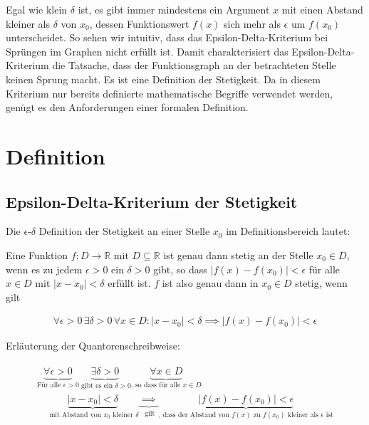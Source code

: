 \documentclass[fontsize=9pt,
               parskip=half-,
               DIV=14,
               listof=chapterentry,
               tocflat]{scrbook}
\begin{document}
Egal wie klein $\delta $ ist, es gibt immer mindestens ein Argument $x$ mit einen Abstand kleiner als $\delta $ von $x_{0}$, dessen Funktionswert $f(x)$ sich mehr als $\epsilon $ um $f(x_{0})$ unterscheidet. So sehen wir intuitiv, dass das Epsilon-Delta-Kriterium bei Sprüngen im Graphen nicht erfüllt ist. Damit charakterisiert das Epsilon-Delta-Kriterium die Tatsache, dass der Funktionsgraph an der betrachteten Stelle keinen Sprung macht. Es ist eine Definition der Stetigkeit. Da in diesem Kriterium nur bereits definierte mathematische Begriffe verwendet werden, genügt es den Anforderungen einer formalen Definition.

\section{Definition}

\subsection{Epsilon-Delta-Kriterium der Stetigkeit}

Die $\epsilon $-$\delta $ Definition der Stetigkeit an einer Stelle $x_{0}$ im Definitionsbereich lautet:



\begin{definition*}
Eine Funktion $f:D\to \mathbb {R} $ mit $D\subseteq \mathbb {R} $ ist genau dann stetig an der Stelle $x_{0}\in D$, wenn es zu jedem $\epsilon >0$ ein $\delta >0$ gibt, so dass $|f(x)-f(x_{0})|<\epsilon $ für alle $x\in D$ mit $|x-x_{0}|<\delta $ erfüllt ist. $f$ ist also genau dann in $x_{0}\in D$ stetig, wenn gilt

\begin{align*}
\forall \epsilon >0\,\exists \delta >0\,\forall x\in D:|x-x_{0}|<\delta \implies |f(x)-f(x_{0})|<\epsilon 
\end{align*}

\end{definition*}



Erläuterung der Quantorenschreibweise:

\begin{align*}
{\begin{array}{l}\underbrace {{\underset {}{}}\forall \epsilon >0} _{{\text{Für alle }}\epsilon >0}\underbrace {{\underset {}{}}\exists \delta >0} _{{\text{ gibt es ein }}\delta >0}\underbrace {{\underset {}{}}\forall x\in D} _{{\text{, so dass für alle }}x\in D}\\[1em]\quad \underbrace {{\underset {}{}}|x-x_{0}|<\delta } _{{\text{ mit Abstand von }}x_{0}{\text{ kleiner }}\delta }\underbrace {{\underset {}{}}\implies } _{\text{ gilt}}\underbrace {{\underset {}{}}|f(x)-f(x_{0})|<\epsilon } _{{\text{, dass der Abstand von }}f(x){\text{ zu }}f(x_{0}){\text{ kleiner als }}\epsilon {\text{ ist}}}\end{array}}
\end{align*}
\end{document}
